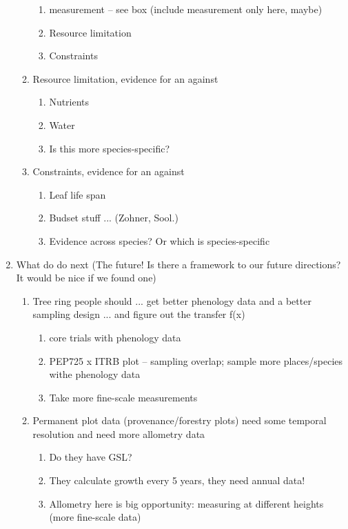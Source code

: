 \documentclass[11pt,letter]{article}
\begin{document}
\begin{enumerate}
\begin{enumerate}
\begin{enumerate} 
\item measurement -- see box  (include measurement only here, maybe)
\item Resource limitation
\item Constraints
\end{enumerate}
\item Resource limitation, evidence for an against 
\begin{enumerate}
\item Nutrients
\item Water
\item Is this more species-specific?
\end{enumerate}
\item Constraints, evidence for an against 
\begin{enumerate}
\item Leaf life span
\item Budset stuff ... (Zohner, Sool.)
\item Evidence across species? Or which is species-specific
\end{enumerate}
\end{enumerate}
\item What do do next (The future! Is there a framework to our future directions? It would be nice if we found one)
\begin{enumerate}
\item Tree ring people should ... get better phenology data and a better sampling design ... and figure out the transfer f(x)
\begin{enumerate}
\item core trials with phenology data
\item PEP725 x ITRB plot -- sampling overlap; sample more places/species withe phenology data
\item Take more fine-scale measurements
\end{enumerate}
\item Permanent plot data (provenance/forestry plots) need some temporal resolution and need more allometry data
\begin{enumerate}
\item Do they have GSL? 
\item They calculate growth every 5 years, they need annual data!
\item Allometry here is big opportunity: measuring at different heights (more fine-scale data)

\end{enumerate}
\end{enumerate}
\end{enumerate}
\end{document}
